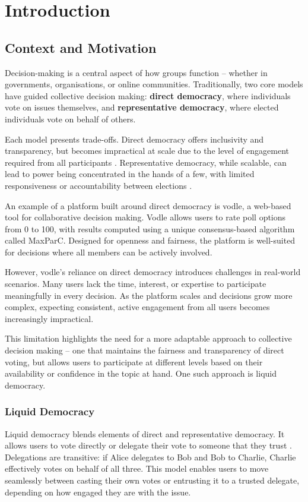 \chapter{Introduction}\label{ch:introduction}

\section{Context and Motivation}

Decision-making is a central aspect of how groups function -- whether in governments, organisations, or online communities. Traditionally, two core models have guided collective decision making: \textbf{direct democracy}, where individuals vote on issues themselves, and \textbf{representative democracy}, where elected individuals vote on behalf of others.

Each model presents trade-offs. Direct democracy offers inclusivity and transparency, but becomes impractical at scale due to the level of engagement required from all participants \citep{ford_delegative_2002}. Representative democracy, while scalable, can lead to power being concentrated in the hands of a few, with limited responsiveness or accountability between elections \citep{blum_liquid_2016}.

An example of a platform built around direct democracy is vodle, a web-based tool for collaborative decision making. Vodle allows users to rate poll options from 0 to 100, with results computed using a unique consensus-based algorithm called MaxParC. Designed for openness and fairness, the platform is well-suited for decisions where all members can be actively involved.

However, vodle's reliance on direct democracy introduces challenges in real-world scenarios. Many users lack the time, interest, or expertise to participate meaningfully in every decision. As the platform scales and decisions grow more complex, expecting consistent, active engagement from all users becomes increasingly impractical.

This limitation highlights the need for a more adaptable approach to collective decision making -- one that maintains the fairness and transparency of direct voting, but allows users to participate at different levels based on their availability or confidence in the topic at hand.
One such approach is liquid democracy.

\subsection{Liquid Democracy}
Liquid democracy blends elements of direct and representative democracy. It allows users to vote directly or delegate their vote to someone that they trust \citep{blum_liquid_2016}. Delegations are transitive: if Alice delegates to Bob and Bob to Charlie, Charlie effectively votes on behalf of all three. This model enables users to move seamlessly between casting their own votes or entrusting it to a trusted delegate, depending on how engaged they are with the issue.

